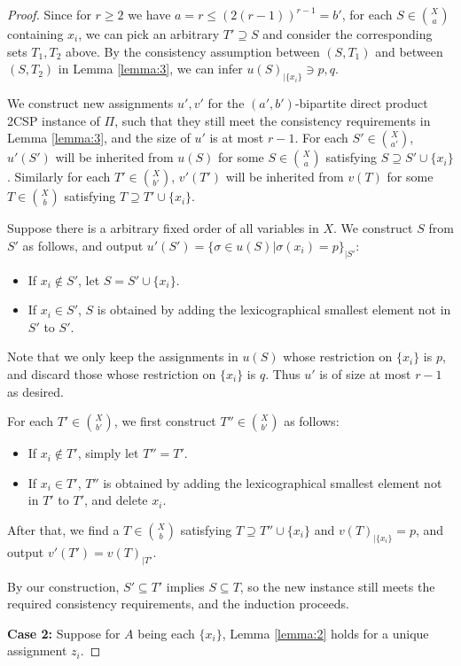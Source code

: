 \begin{proof}
    Since for $r\ge 2$ we have $a=r\le (2(r-1))^{r-1}=b'$, for each $S \in \binom{X}{a}$ containing $x_i$, we can pick an arbitrary $T'\supseteq S$ and consider the corresponding sets $T_1,T_2$ above. By the consistency assumption between $(S,T_1)$ and between $(S,T_2)$ in Lemma \ref{lemma:3}, we can infer $u(S)_{|\{x_i\}}\ni p,q$.

    We construct new assignments $u',v'$ for the $(a',b')$-bipartite direct product 2CSP instance of $\Pi$, such that they still meet the consistency requirements in Lemma \ref{lemma:3}, and the size of $u'$ is at most $r-1$. For each $S' \in \binom{X}{a'}$, $u'(S')$ will be inherited from $u(S)$ for some $S \in \binom{X}{a}$ satisfying $S \supseteq S'\cup\{x_i\}$. Similarly for each $T' \in \binom{X}{b'}$, $v'(T')$ will be inherited from $v(T)$ for some $T \in \binom{X}{b}$ satisfying $T \supseteq T'\cup\{x_i\}$. 

    Suppose there is a arbitrary fixed order of all variables in $X$. We construct $S$ from $S'$ as follows, and output $u'(S')=\{\sigma \in u(S)|\sigma(x_i)=p\}_{|S'}$:
    \begin{itemize}
        \item If $x_i \not\in S'$, let $S=S'\cup \{x_i\}$.
        \item If $x_i \in S'$, $S$ is obtained by adding the lexicographical smallest element not in $S'$ to $S'$.
    \end{itemize}
    Note that we only keep the assignments in $u(S)$ whose restriction on $\{x_i\}$ is $p$, and discard those whose restriction on $\{x_i\}$ is $q$. Thus $u'$ is of size at most $r-1$ as desired.

    For each $T' \in \binom{X}{b'}$, we first construct $T''\in \binom{X}{b'}$ as follows:
    \begin{itemize}
        \item If $x_i \notin T'$, simply let $T''=T'$.
        \item If $x_i \in T'$, $T''$ is obtained by adding the lexicographical smallest element not in $T'$ to $T'$, and delete $x_i$.
    \end{itemize}
    After that, we find a $T \in \binom{X}{b}$ satisfying $T \supseteq T'' \cup \{x_i\}$ and $v(T)_{|\{x_i\}}=p$, and output $v'(T')=v(T)_{|T'}$.

    By our construction, $S' \subseteq T'$ implies $S \subseteq T$, so the new instance still meets the required consistency requirements, and the induction proceeds.

\medskip\noindent\textbf{Case 2:} Suppose for $A$ being each $\{x_i\}$, Lemma \ref{lemma:2} holds for a unique assignment $z_i$. 


\end{proof}
